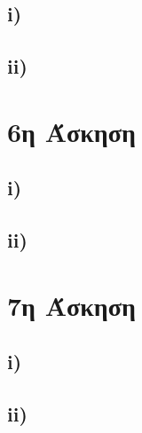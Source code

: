 \documentclass[17pt]{extarticle}
\begin{document}
\subsection*{i)}
\subsection*{ii)}
\section*{6η Άσκηση}
\subsection*{i)}
\subsection*{ii)}
\section*{7η Άσκηση}
\subsection*{i)}
\subsection*{ii)}
\end{document}

